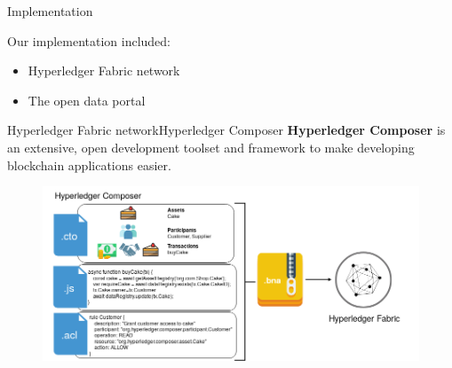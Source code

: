\begin{frame}{Implementation}

    Our implementation included:
    \begin{itemize}
        \item Hyperledger Fabric network
        \item The open data portal
    \end{itemize}
\end{frame}


\begin{frame}{Hyperledger Fabric network}{Hyperledger Composer}
    \textbf{Hyperledger Composer} is an extensive, open development toolset and framework to make developing blockchain applications easier.
    \pause
    \begin{figure}
        \centering
        \includegraphics[width=\textwidth,height=0.45\textwidth]{img/HC.png}
    \end{figure}
\end{frame}

